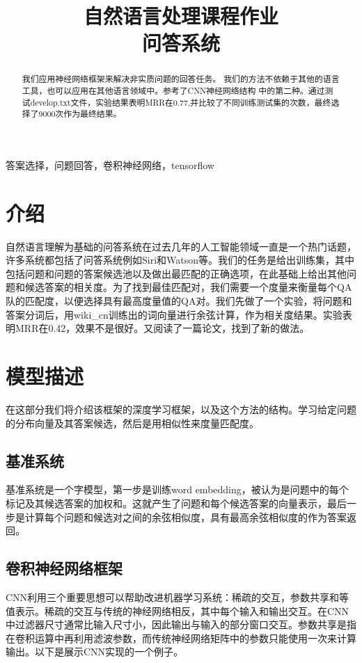 \documentclass{article}
\title{自然语言处理课程作业 \\问答系统}
\begin{document}
%
\maketitle
%


\begin{abstract}
我们应用神经网络框架来解决非实质问题的回答任务。
我们的方法不依赖于其他的语言工具，也可以应用在其他语言领域中。参考了CNN神经网络结构 \cite{adlt}中的第二种。通过测试develop.txt文件，实验结果表明MRR在0.77,并比较了不同训练测试集的次数，最终选择了9000次作为最终结果。

\end{abstract}

%
\begin{keywords}
答案选择，问题回答，卷积神经网络，tensorflow
\end{keywords}
%
\section{介绍}
\label{sec:intro}
自然语言理解为基础的问答系统在过去几年的人工智能领域一直是一个热门话题，许多系统都包括了问答系统例如Siri和Watson等。我们的任务是给出训练集，其中包括问题和问题的答案候选池以及做出最匹配的正确选项，在此基础上给出其他问题和候选答案的相关度。为了找到最佳匹配对，我们需要一个度量来衡量每个QA队的匹配度，以便选择具有最高度量值的QA对。我们先做了一个实验，将问题和答案分词后，用wiki\_cn训练出的词向量进行余弦计算，作为相关度结果。实验表明MRR在0.42，效果不是很好。又阅读了一篇论文\cite{adlt}，找到了新的做法。


\section{模型描述}
\label{sec:model}
在这部分我们将介绍该框架的深度学习框架，以及这个方法的结构。学习给定问题的分布向量及其答案候选，然后是用相似性来度量匹配度。

\subsection{基准系统} 
基准系统是一个字模型，第一步是训练word embedding，被认为是问题中的每个标记及其候选答案的加权和。这就产生了问题和每个候选答案的向量表示，最后一步是计算每个问题和候选对之间的余弦相似度，具有最高余弦相似度的作为答案返回。


\subsection{卷积神经网络框架}
CNN利用三个重要思想可以帮助改进机器学习系统：稀疏的交互，参数共享和等值表示。稀疏的交互与传统的神经网络相反，其中每个输入和输出交互。在CNN中过滤器尺寸通常比输入尺寸小，因此输出与输入的部分窗口交互。参数共享是指在卷积运算中再利用滤波参数，而传统神经网络矩阵中的参数只能使用一次来计算输出。以下是展示CNN实现的一个例子。
\end{document}
